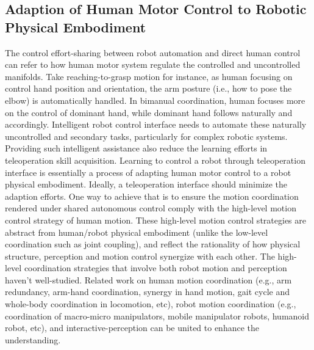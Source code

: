 \subsection{Adaption of Human Motor Control to Robotic Physical Embodiment}\label{sec:back-intelligent}
The control effort-sharing between robot automation and direct human control can refer to how human motor system regulate the controlled and uncontrolled manifolds. Take reaching-to-grasp motion for instance, as human focusing on control hand position and orientation, the arm posture (i.e., how to pose the elbow) is automatically handled. In bimanual coordination, human focuses more on the control of dominant hand, while dominant hand follows naturally and accordingly. Intelligent robot control interface needs to automate these naturally uncontrolled and secondary tasks, particularly for complex robotic systems. Providing such intelligent assistance also reduce the learning efforts in teleoperation skill acquisition. Learning to control a robot through teleoperation interface is essentially a process of adapting human motor control to a robot physical embodiment. Ideally, a teleoperation interface should minimize the adaption efforts. One way to achieve that is to ensure the motion coordination rendered under shared autonomous control comply with the high-level motion control strategy of human motion. These high-level motion control strategies are abstract from human/robot physical embodiment (unlike the low-level coordination such as joint coupling), and reflect the rationality of how physical structure, perception and motion control synergize with each other. The high-level coordination strategies that involve both robot motion and perception haven’t well-studied. Related work on human motion coordination (e.g., arm redundancy, arm-hand coordination, synergy in hand motion, gait cycle and whole-body coordination in locomotion, etc), robot motion coordination (e.g., coordination of macro-micro manipulators, mobile manipulator robots, humanoid robot, etc), and interactive-perception can be united to enhance the understanding. 




